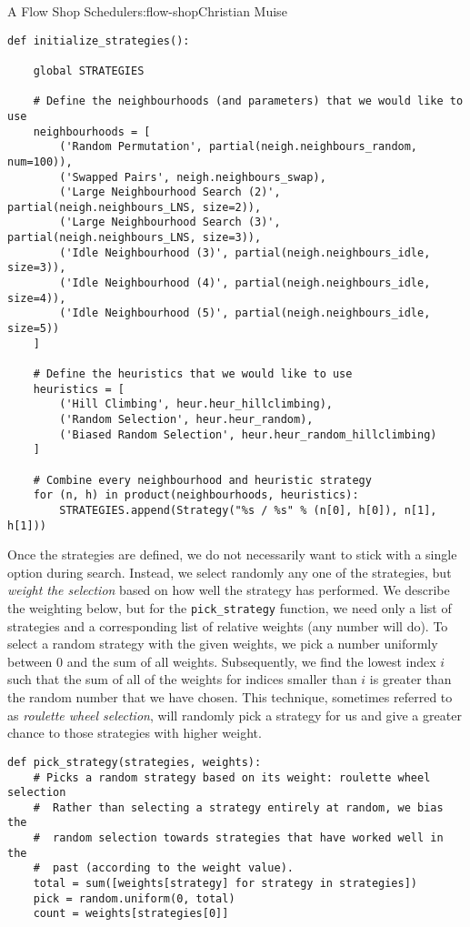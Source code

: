 \begin{aosachapter}{A Flow Shop Scheduler}{s:flow-shop}{Christian Muise}
\begin{verbatim}
def initialize_strategies():

    global STRATEGIES

    # Define the neighbourhoods (and parameters) that we would like to use
    neighbourhoods = [
        ('Random Permutation', partial(neigh.neighbours_random, num=100)),
        ('Swapped Pairs', neigh.neighbours_swap),
        ('Large Neighbourhood Search (2)', partial(neigh.neighbours_LNS, size=2)),
        ('Large Neighbourhood Search (3)', partial(neigh.neighbours_LNS, size=3)),
        ('Idle Neighbourhood (3)', partial(neigh.neighbours_idle, size=3)),
        ('Idle Neighbourhood (4)', partial(neigh.neighbours_idle, size=4)),
        ('Idle Neighbourhood (5)', partial(neigh.neighbours_idle, size=5))
    ]

    # Define the heuristics that we would like to use
    heuristics = [
        ('Hill Climbing', heur.heur_hillclimbing),
        ('Random Selection', heur.heur_random),
        ('Biased Random Selection', heur.heur_random_hillclimbing)
    ]

    # Combine every neighbourhood and heuristic strategy
    for (n, h) in product(neighbourhoods, heuristics):
        STRATEGIES.append(Strategy("%s / %s" % (n[0], h[0]), n[1], h[1]))
\end{verbatim}

Once the strategies are defined, we do not necessarily want to stick
with a single option during search. Instead, we select randomly any one
of the strategies, but \emph{weight the selection} based on how well the
strategy has performed. We describe the weighting below, but for the
\texttt{pick\_strategy} function, we need only a list of strategies and
a corresponding list of relative weights (any number will do). To select
a random strategy with the given weights, we pick a number uniformly
between 0 and the sum of all weights. Subsequently, we find the lowest
index $i$ such that the sum of all of the weights for indices smaller
than $i$ is greater than the random number that we have chosen. This
technique, sometimes referred to as \emph{roulette wheel selection},
will randomly pick a strategy for us and give a greater chance to those
strategies with higher weight.

\begin{verbatim}
def pick_strategy(strategies, weights):
    # Picks a random strategy based on its weight: roulette wheel selection
    #  Rather than selecting a strategy entirely at random, we bias the
    #  random selection towards strategies that have worked well in the
    #  past (according to the weight value).
    total = sum([weights[strategy] for strategy in strategies])
    pick = random.uniform(0, total)
    count = weights[strategies[0]]


\end{verbatim}
\end{aosachapter}
